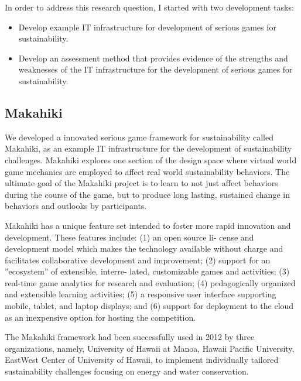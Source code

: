 In order to address this research question, I started with two development tasks:
\begin{itemize}
    \item Develop example IT infrastructure for development of serious games for sustainability.

    \item Develop an assessment method that provides evidence of the strengths and weaknesses of the IT infrastructure for the development of serious games for sustainability.
\end{itemize}

\subsection{Makahiki}

We developed a innovated serious game framework for sustainability called Makahiki, as an example IT infrastructure for the development of sustainability challenges. Makahiki explores one section of the design space
where virtual world game mechanics are employed to affect real world sustainability
behaviors.  The ultimate goal of the Makahiki project is to learn to
not just affect behaviors during the course of the game, but to
produce long lasting, sustained change in behaviors and
outlooks by participants.

 Makahiki has a unique feature set intended
to foster more rapid innovation and development. These features include: (1) an open source li-
cense and development model which makes the technology available without charge and facilitates
collaborative development and improvement; (2) support for an ”ecosystem” of extensible, interre-
lated, customizable games and activities; (3) real-time game analytics for research
and evaluation; (4) pedagogically organized and extensible learning activities; (5) a responsive user
interface supporting mobile, tablet, and laptop displays; and (6) support for deployment to the
cloud as an inexpensive option for hosting the competition.

The Makahiki framework had been successfully used in 2012 by three organizations, namely, University of
Hawaii at Manoa, Hawaii Pacific University, EastWest Center of University of Hawaii, to implement
individually tailored sustainability challenges focusing on energy and water conservation.

